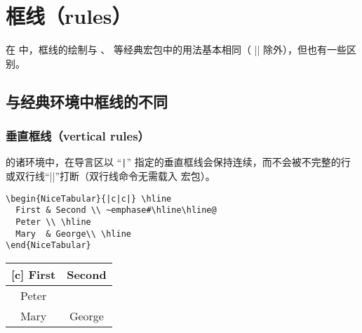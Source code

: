 \documentclass[dvipsnames]{article}%
\begin{document}
\section{框线（rules）}

在  中，框线的绘制与 、 等经典宏包中的用法基本相同（ |\vline| 除外），但也有一些区别。

\bigskip
\subsection{与经典环境中框线的不同}

\subsubsection{垂直框线（vertical rules）}


 的诸环境中，在导言区以 “\verb+|+” 指定的垂直框线会保持连续，而不会被不完整的行或双行线“|\hline \hline|”打断（双行线命令无需载入  宏包）。

\bigskip
\begin{BVerbatim}[baseline=c,boxwidth=10cm]
\begin{NiceTabular}{|c|c|} \hline
  First & Second \\ ~emphase#\hline\hline@
  Peter \\ \hline
  Mary  & George\\ \hline
\end{NiceTabular}
\end{BVerbatim}
\begin{NiceTabular}{|c|c|}[c] \hline
First & Second \\ \hline\hline
Peter \\ \hline
Mary  & George \\ \hline
\end{NiceTabular}
\end{document}
